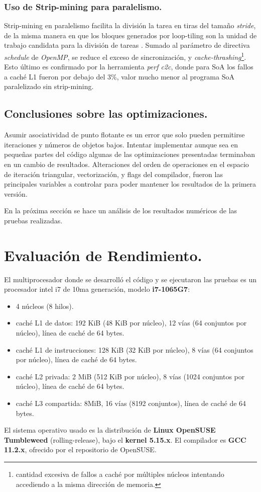 \documentclass{article}
\begin{document}
\subsubsection{Uso de Strip-mining para paralelismo.\label{strip-mining-parallel}}
Strip-mining en paralelismo facilita la división la tarea en tiras del tamaño \textit{stride}, de la misma
manera en que los bloques generados por loop-tiling son la unidad de trabajo candidata para la división
de tareas \cite{Wolfe89moreiteration}. Sumado al parámetro de directiva \textit{schedule} de \textit{OpenMP},
se reduce el exceso de sincronización, y \textit{cache-thrashing}\footnote{cantidad excesiva
de fallos a caché por múltiples núcleos intentando accediendo a la misma dirección de memoria.}. Esto último
es confirmado por la herramienta \textit{perf c2c}, donde para SoA los fallos a caché L1 fueron por debajo
del 3\%, valor mucho menor al programa SoA paralelizado sin strip-mining.

\subsection{Conclusiones sobre las optimizaciones.\label{opt_conclusiones}}
Asumir asociatividad de punto flotante es un error que solo pueden permitirse iteraciones
y números de objetos bajos. Intentar implementar aunque sea en pequeñas partes del código algunas de
las optimizaciones presentadas terminaban en un cambio de resultados. Alteraciones del orden de operaciones
en el espacio de iteración triangular, vectorización, y flags del compilador, fueron las principales
variables a controlar para poder mantener los resultados de la primera versión.

En la próxima sección se hace un análisis de los resultados numéricos de las pruebas realizadas.

\section{Evaluación de Rendimiento.\label{performance}}
El multiprocesador donde se desarrolló el código y se ejecutaron las pruebas es un
procesador intel i7 de 10ma generación, modelo \textbf{i7-1065G7}:
\begin{itemize}
	\item 4 núcleos (8 hilos).
	\item caché L1 de datos: 192 KiB (48 KiB por núcleo), 12 vías (64 conjuntos por núcleo), línea de caché de 64 bytes.
	\item caché L1 de instrucciones: 128 KiB (32 KiB por núcleo), 8 vías (64 conjuntos por núcleo), línea de caché de 64 bytes.
	\item caché L2 privada: 2 MiB (512 KiB por núcleo), 8 vías (1024 conjuntos por núcleo), línea de caché de 64 bytes.
	\item caché L3 compartida: 8MiB, 16 vías (8192 conjuntos), línea de caché de 64 bytes.
\end{itemize}
El sistema operativo usado es la distribución de \textbf{Linux OpenSUSE Tumbleweed} (rolling-release),
bajo el \textbf{kernel 5.15.x}. El compilador es \textbf{GCC 11.2.x}, ofrecido por el repositorio de OpenSUSE.
\end{document}
